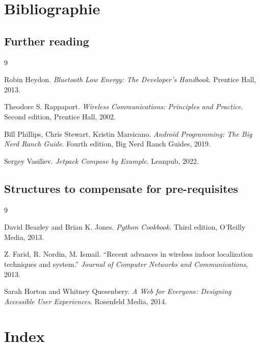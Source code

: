 \documentclass[12pt,a4paper]{article}
\begin{document}
\newpage

\section{Bibliographie}

\subsection{Further reading}

\begin{thebibliography}{9}

Robin Heydon.  
\textit{Bluetooth Low Energy: The Developer's Handbook}.  
Prentice Hall, 2013.

Theodore S. Rappaport.  
\textit{Wireless Communications: Principles and Practice}.  
Second edition, Prentice Hall, 2002.

Bill Phillips, Chris Stewart, Kristin Marsicano.  
\textit{Android Programming: The Big Nerd Ranch Guide}.  
Fourth edition, Big Nerd Ranch Guides, 2019.

Sergey Vasiliev.  
\textit{Jetpack Compose by Example}.  
Leanpub, 2022.

\end{thebibliography}

\subsection{Structures to compensate for pre-requisites}

\begin{thebibliography}{9}

David Beazley and Brian K. Jones.  
\textit{Python Cookbook}.  
Third edition, O'Reilly Media, 2013.

Z. Farid, R. Nordin, M. Ismail.  
``Recent advances in wireless indoor localization techniques and system.''  
\textit{Journal of Computer Networks and Communications}, 2013.

Sarah Horton and Whitney Quesenbery.  
\textit{A Web for Everyone: Designing Accessible User Experiences}.  
Rosenfeld Media, 2014.

\end{thebibliography}

\section{Index}
\noindent\begin{minipage}{\textwidth}
\printindex
\end{minipage}
\newpage
\end{document}
